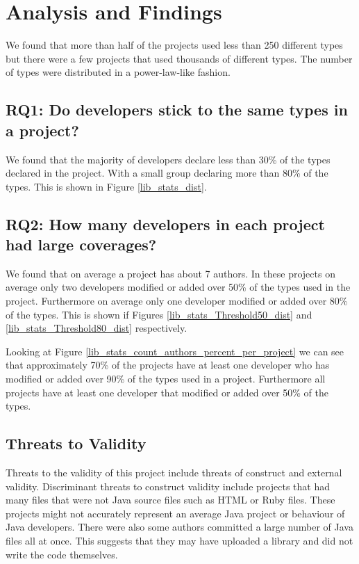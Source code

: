 \documentclass{sig-alternate-05-2015}
\begin{document}
\section{Analysis and Findings}
We found that more than half of the projects used less than 250 different types but there were a few projects that used thousands of different types. The number of types were distributed in a power-law-like fashion.

\subsection{RQ1: Do developers stick to the same types in a project?}
We found that the majority of developers declare less than 30\% of the types declared in the project. With a small group declaring more than 80\% of the types. This is shown in Figure \ref{lib_stats_dist}.

\subsection{RQ2: How many developers in each project had large coverages?}
We found that on average a project has about 7 authors. In these projects on average only two developers modified or added over 50\% of the types used in the project. Furthermore on average only one developer modified or added over 80\% of the types. This is shown if Figures \ref{lib_stats_Threshold50_dist} and \ref{lib_stats_Threshold80_dist} respectively. 


Looking at Figure \ref{lib_stats_count_authors_percent_per_project} we can see that approximately 70\% of the projects have at least one developer who has modified or added over 90\% of the types used in a project. Furthermore all projects have at least one developer that modified or added over 50\% of the types.

\subsection{Threats to Validity}
Threats to the validity of this project include threats of construct and external validity. Discriminant threats to construct validity include projects that had many files that were not Java source files such as HTML or Ruby files. These projects might not accurately represent an average Java project or behaviour of Java developers. There were also some authors committed a large number of Java files all at once. This suggests that they may have uploaded a library and did not write the code themselves.
\end{document}

